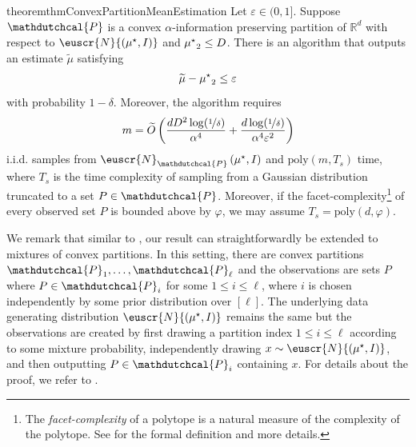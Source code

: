 \documentclass[11pt,letterpaper]{article}
\theoremstyle{plain}
\theoremstyle{definition}
\theoremstyle{remark}
\newcommand{\inparen}[1]{\ensuremath{\left(#1\right)}}
\let\norm\relax
\newcommand{\norm}[1]{\ensuremath{\left\lVert #1 \right\rVert}}
\newcommand{\R}{\mathbb{R}}
\newcommand{\nfrac}[2]{\nicefrac{#1}{#2}}
\newcommand{\poly}{\mathrm{poly}}
\newcommand{\iid}{i.i.d.}
\newcommand{\eps}{\varepsilon}
\renewcommand{\tilde}{\widetilde}
\newcommand{\customcal}[1]{\euscr{#1}}
\newcommand{\cN}{\customcal{N}}
\newcommand{\hypo}[1]{\mathdutchcal{#1}}
\newcommand{\hyP}{\hypo{P}}
\newcommand{\normal}[2]{\cN{\inparen{#1,#2}}}
\newcommand{\coarseNormal}[3]{\cN_{#3}\inparen{#1,#2}}
\newcommand{\muStar}{{\mu^\star}}
\begin{document}
{    \begin{restatable}{theorem}{thmConvexPartitionMeanEstimation}\label{thm:convexPartitionMeanEstimation}
        Let $\eps\in (0, 1]$.
        Suppose $\hyP$ is a convex $\alpha$-information preserving partition of $\R^d$ 
        with respect to $\normal{\muStar}{I}$
        and $\norm{\muStar}_2\leq D$.
        There is an algorithm that outputs an estimate $\tilde \mu$ satisfying
        \[
            \norm{\tilde \mu - \muStar}_2 \leq \eps
        \]
        with probability $1-\delta$. Moreover, the algorithm requires
        \[
            m = \tilde O\inparen{\frac{dD^2\log(\nfrac1\delta)}{\alpha^4} + \frac{d\log(\nfrac1\delta)}{\alpha^4\eps^2}}
        \]
        \iid{} samples from $\coarseNormal{\muStar}{I}{\hyP}$ and $\poly(m, T_s)$ time,
        where $T_s$ is the time complexity of sampling from a Gaussian distribution truncated to a set $P\in \hyP$.
        {Moreover,
        if the facet-complexity\footnote{The \emph{facet-complexity} \cite[Definition 6.2.2]{grotschel1988geometric} of a polytope is a natural measure of the complexity of the polytope.
        See  for the formal definition and more details.}
        of every observed set $P$ is bounded above by $\varphi$,
        we may assume $T_s = \poly(d, \varphi)$.}
    \end{restatable}
    {We remark that similar to \cite{fotakis2021coarse},
    our result can straightforwardly be extended to mixtures of convex partitions. 
    In this setting,
    there are convex partitions $\hyP_1, \dots, \hyP_\ell$ and the observations are sets $P$ where $P\in \hyP_i$ for some $1\leq i\leq \ell$, where $i$ is chosen independently by some prior distribution over $[\ell]$.
    The underlying  data generating distribution $\normal{\muStar}{I}$ remains the same
    but the observations are created by first drawing a partition index $1\leq i\leq \ell$ according to some mixture probability,
    independently drawing $x\sim \normal{\muStar}{I}$,
    and then outputting $P\in \hyP_i$ containing $x$.
     For details about the proof, we refer to .
    


}}
\end{document}
